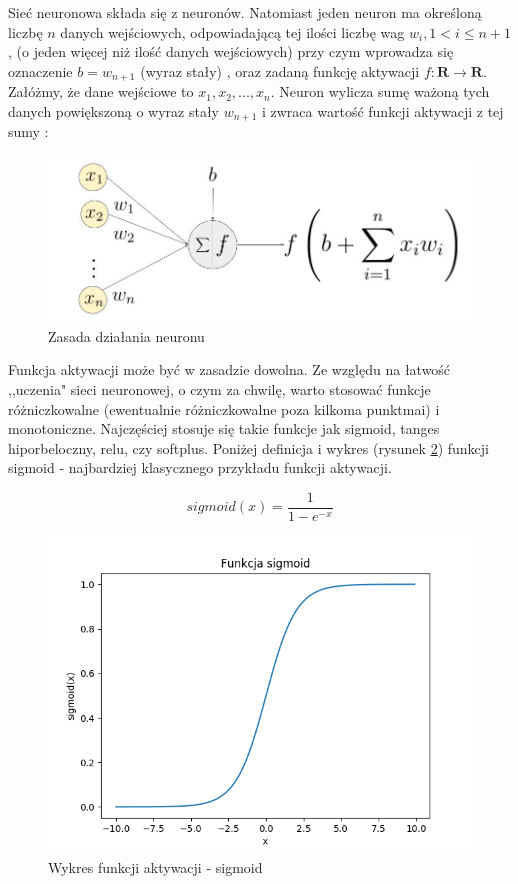 \documentclass[licencjacka]{pracamgr}
\begin{document}
Sieć neuronowa składa się z neuronów. Natomiast jeden neuron ma określoną liczbę $n$ danych wejściowych, odpowiadającą tej ilości liczbę wag $w_{i}, 1 < i\leq n+1$, (o jeden więcej niż ilość danych wejściowych) przy czym wprowadza się 
oznaczenie  $b=w_{n+1}$ (wyraz stały)  , oraz zadaną funkcję aktywacji $f:\mathbf{R}\rightarrow\mathbf{R}$.  Załóżmy, że dane wejściowe to $x_{1}, x_{2},...,x_{n}$.  Neuron wylicza sumę ważoną tych danych powiększoną o wyraz stały $w_{n+1}$ i zwraca wartość funkcji aktywacji z tej sumy :

\begin{figure}[h!]
	\includegraphics [scale=0.2]{neuron.png}
	\caption{Zasada działania neuronu}
	\label{Rys20}
\end{figure}


Funkcja aktywacji może być w zasadzie dowolna. Ze względu na łatwość ,,uczenia" sieci neuronowej, o czym za chwilę, warto stosować funkcje różniczkowalne (ewentualnie różniczkowalne poza kilkoma punktmai) i monotoniczne. Najczęściej stosuje się takie funkcje jak sigmoid, tanges hiporbeloczny, relu, czy softplus.  Poniżej definicja i wykres (rysunek \ref{Rys21}) funkcji sigmoid - najbardziej klasycznego przykładu funkcji aktywacji.

$$sigmoid(x) = \frac{1}{1-e^{-x}}$$
\begin{figure}[h!]
	\includegraphics [scale=0.5]{sigmoid.png}
	\caption{Wykres funkcji aktywacji - sigmoid}
	\label{Rys21}
\end{figure}
\end{document}
